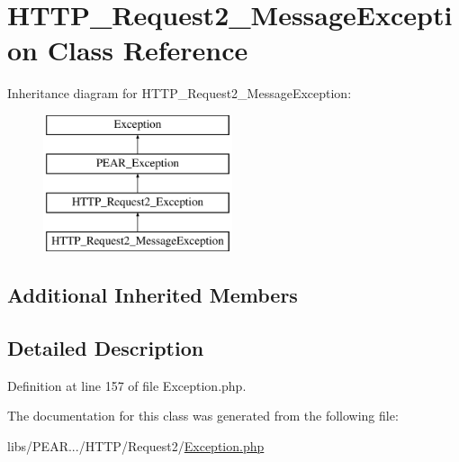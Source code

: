 \hypertarget{classHTTP__Request2__MessageException}{\section{H\-T\-T\-P\-\_\-\-Request2\-\_\-\-Message\-Exception Class Reference}
\label{classHTTP__Request2__MessageException}
}
Inheritance diagram for H\-T\-T\-P\-\_\-\-Request2\-\_\-\-Message\-Exception\-:\begin{figure}[H]
\begin{center}
\leavevmode
\includegraphics[height=4.000000cm]{classHTTP__Request2__MessageException}
\end{center}
\end{figure}
\subsection*{Additional Inherited Members}


\subsection{Detailed Description}


Definition at line 157 of file Exception.\-php.



The documentation for this class was generated from the following file\-:\begin{DoxyCompactItemize}
\item 
libs/\-P\-E\-A\-R.../\-H\-T\-T\-P/\-Request2/\hyperlink{HTTP_2Request2_2Exception_8php}{Exception.\-php}\end{DoxyCompactItemize}
